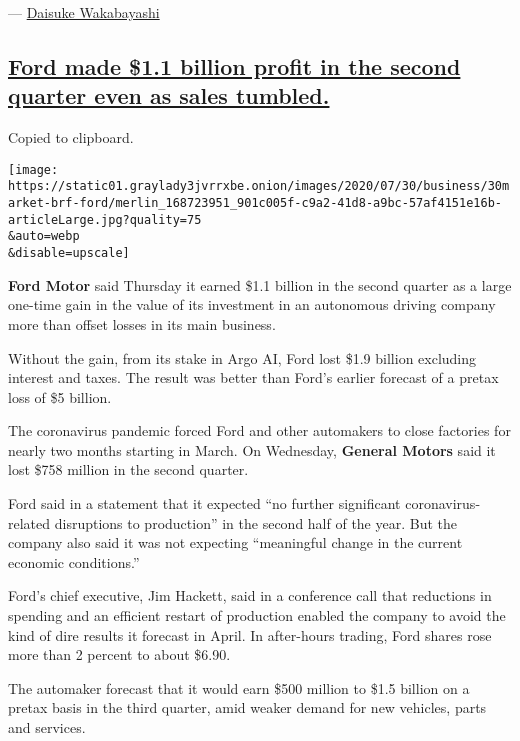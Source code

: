 ---
\href{https://www.nytimes3xbfgragh.onion/by/daisuke-wakabayashi}{Daisuke
Wakabayashi}

\hypertarget{ford-made-11-billion-profit-in-the-second-quarter-even-as-sales-tumbled}{%
\subsection{\texorpdfstring{\protect\hyperlink{ford-made-1-1-billion-profit-in-the-second-quarter-even-as-sales-tumbled}{Ford
made \$1.1 billion profit in the second quarter even as sales
tumbled.}}{Ford made \$1.1 billion profit in the second quarter even as sales tumbled.}}\label{ford-made-11-billion-profit-in-the-second-quarter-even-as-sales-tumbled}}

Copied to clipboard.

\texttt{[image: https://static01.graylady3jvrrxbe.onion/images/2020/07/30/business/30market-brf-ford/merlin\_168723951\_901c005f-c9a2-41d8-a9bc-57af4151e16b-articleLarge.jpg?quality=75\\\&auto=webp\\\&disable=upscale]}

\textbf{Ford Motor} said Thursday it earned \$1.1 billion in the second
quarter as a large one-time gain in the value of its investment in an
autonomous driving company more than offset losses in its main business.

Without the gain, from its stake in Argo AI, Ford lost \$1.9 billion
excluding interest and taxes. The result was better than Ford's earlier
forecast of a pretax loss of \$5 billion.

The coronavirus pandemic forced Ford and other automakers to close
factories for nearly two months starting in March. On Wednesday,
\textbf{General Motors} said it lost \$758 million in the second
quarter.

Ford said in a statement that it expected ``no further significant
coronavirus-related disruptions to production'' in the second half of
the year. But the company also said it was not expecting ``meaningful
change in the current economic conditions.''

Ford's chief executive, Jim Hackett, said in a conference call that
reductions in spending and an efficient restart of production enabled
the company to avoid the kind of dire results it forecast in April. In
after-hours trading, Ford shares rose more than 2 percent to about
\$6.90.

The automaker forecast that it would earn \$500 million to \$1.5 billion
on a pretax basis in the third quarter, amid weaker demand for new
vehicles, parts and services.

